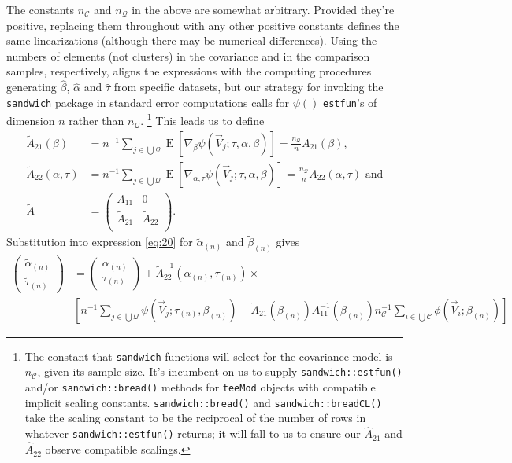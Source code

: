 \documentclass{article}
\newcommand{\EE}{\operatorname{E}}
\begin{document}
The constants $n_{\mathcal{C}}$ and
$n_{\mathcal{Q}}$ in the above are somewhat
arbitrary.  Provided they're positive, replacing them throughout with any other
positive constants defines the same linearizations (although there may
be numerical differences).
Using the numbers of elements (not
clusters) in the covariance and in the comparison samples,
respectively, aligns the expressions with the computing procedures
generating $\hat\beta$, $\hat{\alpha}$ and $\hat\tau$ from specific
datasets, but our strategy for invoking the \texttt{sandwich} package
in standard error computations calls for  $\psi()$ \texttt{estfun}'s
of dimension $n$ rather than $n_{\mathcal{Q}}$.%
\footnote{%
  The constant that \texttt{sandwich}
  functions will select for the covariance model is $n_{\mathcal{C}}$, given its sample
  size.  It's incumbent on us to supply \texttt{sandwich::estfun()}
  and/or \texttt{sandwich::bread()} methods for
  \texttt{teeMod} objects with compatible implicit scaling
  constants. \texttt{sandwich::bread()} and
  \texttt{sandwich::breadCL()} take the scaling constant to be the
  reciprocal of the number of rows in whatever
  \texttt{sandwich::estfun()} returns; it will fall to us to ensure
  our $\hat{A}_{21}$ and $\hat{A}_{22}$ observe compatible scalings.}%
 This leads us to
define
\begin{align}\label{eq:29}
  \tilde{A}_{21}(\beta) &= n^{-1} \sum_{j\in \bigcup
        \mathcal{Q}}\EE[ \nabla_{\beta}\psi(\vec{V}_{j};
        \tau, \alpha, \beta )] = \frac{n_{\mathcal{Q}}}{n} {A}_{21}(\beta),\\
  \tilde{A}_{22}(\alpha, \tau) &= n^{-1} \sum_{j\in \bigcup
        \mathcal{Q}}\EE[ \nabla_{\alpha, \tau}\psi(\vec{V}_{j};
        \tau, \alpha, \beta )] = \frac{n_{\mathcal{Q}}}{n}
                                 {A}_{22}(\alpha, \tau) \text{ and}\nonumber\\
  \tilde{A} &= \left(
              \begin{array}{cc}
                A_{11} & 0 \\
                \tilde{A}_{21} & \tilde{A}_{22}\\
              \end{array}
\right).\nonumber
\end{align}
Substitution into  expression \eqref{eq:20} for
$\tilde{\alpha}_{(n)}$ and $\tilde{\beta}_{(n)}$ gives
\begin{align}
      \left(\begin{array}{c}\tilde{\alpha}_{(n)}\\ \tilde{\tau}_{(n)} \end{array}\right)         &=\left(\begin{array}{c}\alpha_{(n)}\\
                         \tau_{(n)} \end{array}\right) +
    \tilde{A}_{22}^{-1}(\alpha_{(n)}, \tau_{(n)})\times \label{eq:21}\\
    & \left[
                 n^{-1}\sum_{j\in \bigcup
                 \mathcal{Q}}\psi(\vec{V}_{j};
                 \tau_{(n)},\beta_{(n)} ) -
      \tilde{A}_{21}(\beta_{(n)})
      {A}_{11}^{-1}(\beta_{(n)})n_{\mathcal{C}}^{-1}\sum_{i\in \bigcup
      \mathcal{C}}\phi(\vec{V}_{i}; \beta_{(n)})\right] \nonumber
\end{align}
\end{document}

